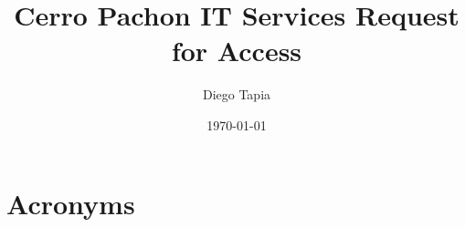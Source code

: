 \documentclass[PMO,authoryear,toc]{lsstdoc}
\title{Cerro Pachon IT Services Request for Access}
\author{%
Diego Tapia
}
\date {\today}
\begin{document}
\maketitle



\appendix
\renewcommand{\refname}{} %


\section{Acronyms} \label{sec:acronyms}

\end{document}
